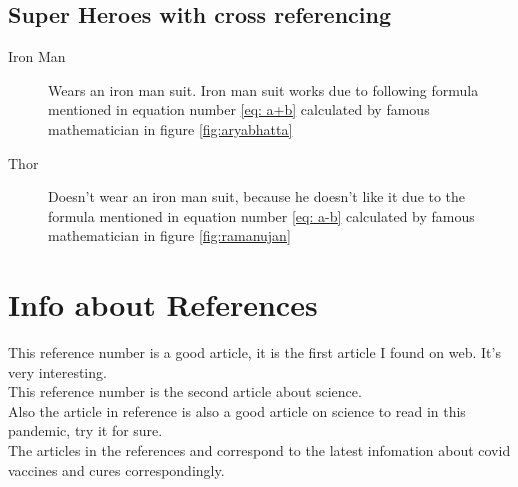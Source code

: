 \documentclass{article}
\begin{document}
\subsection{Super Heroes with cross referencing}
\label{subsec: super}
\begin{description}
	\item[Iron Man] Wears an iron man suit. Iron man suit works due to following formula mentioned in equation number \ref{eq: a+b} calculated by famous mathematician in figure \ref{fig:aryabhatta}
	\item[Thor] Doesn't wear an iron man suit, because he doesn't like it due to the formula mentioned in equation number \ref{eq: a-b} calculated by famous mathematician in figure \ref{fig:ramanujan}
\end{description}
\section{Info about References}
This reference number \cite{Bruchezeabb3753} is a good article, it is the first article I found on web. It's very interesting.
\\
This reference number \cite{10.1093/ibd/izaa212} is the second article about science.
\\
Also the article in reference \cite{10.1093/ndt/gfaa170} is also a good article on science to read in this pandemic, try it for sure.
\\
The articles in the references \cite{Collins603} and \cite{Thorp885} correspond to the latest infomation about covid vaccines and cures correspondingly.
\end{document}
